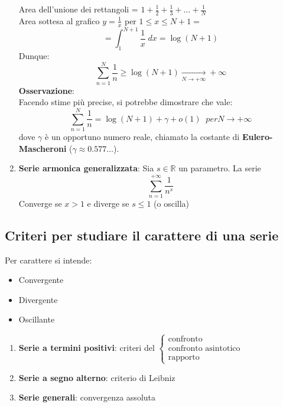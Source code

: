 \documentclass[a4paper]{article}
\theoremstyle{break}
\theoremstyle{break}
\theoremstyle{break}
\theoremstyle{break}
\begin{document}
\begin{enumerate}
\begin{center}
    \end{center}
    Area dell'unione dei rettangoli = \( 1 + \frac{1}{2} + \frac{1}{3} + \ldots + \frac{1}{N} \) \\
    Area sottesa al grafico \( y = \frac{1}{x} \) per \( 1 \le x \le N+1 =\)
    \[= \int_{1}^{N+1} \frac{1}{x}\;dx  = \log(N+1) \]
    Dunque:
    \[
      \sum_{n=1}^{N} \frac{1}{n} \ge \log(N+1) \underset{N \to +\infty}{\to } +\infty
    \] 
    \textbf{Osservazione}:\\
    Facendo stime più precise, si potrebbe dimostrare che vale:
    \[
      \sum_{n=1}^{N} \frac{1}{n} = \log(N+1) + \gamma + o(1) \;\; per N \to +\infty
    \] 
    dove \( \gamma  \) è un opportuno numero reale, chiamato la costante di \textbf{Eulero-Mascheroni}
    (\( \gamma \approx 0.577 \ldots \)).
  \item \textbf{Serie armonica generalizzata}:
    Sia \( s \in \mathbb{R} \) un parametro. La serie
    \[
      \sum_{n=1}^{+\infty} \frac{1}{n^s}
    \] 
    Converge se \( x > 1 \) e diverge se \( s \le 1 \) (o oscilla)
\end{enumerate}

\subsection{Criteri per studiare il carattere di una serie}
Per carattere si intende:
\begin{itemize}
  \item Convergente
  \item Divergente
  \item Oscillante
\end{itemize}
\begin{enumerate}
  \item \textbf{Serie a termini positivi}: criteri del \( \begin{cases}
      \text{confronto}\\
      \text{confronto asintotico}\\
      \text{rapporto}
    \end{cases} \) 
  \item \textbf{Serie a segno alterno}: criterio di Leibniz
  \item \textbf{Serie generali}: convergenza assoluta
\end{enumerate}
\end{document}
